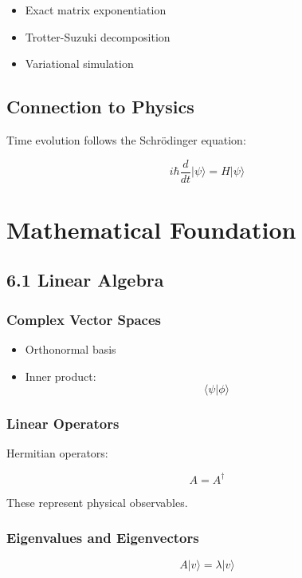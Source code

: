 \begin{itemize}
\item Exact matrix exponentiation
\item Trotter-Suzuki decomposition
\item Variational simulation
\end{itemize}

\subsection*{Connection to Physics}

Time evolution follows the Schrödinger equation:

\[
i\hbar \frac{d}{dt} |\psi\rangle = H |\psi\rangle
\]

\vspace{0.5cm}

\section*{Mathematical Foundation}

\subsection*{6.1 Linear Algebra}

\subsubsection*{Complex Vector Spaces}

\begin{itemize}
\item Orthonormal basis
\item Inner product:
\[
\langle \psi | \phi \rangle
\]
\end{itemize}

\subsubsection*{Linear Operators}

Hermitian operators:

\[
A = A^\dagger
\]

These represent physical observables.

\subsubsection*{Eigenvalues and Eigenvectors}

\[
A |v\rangle = \lambda |v\rangle
\]

